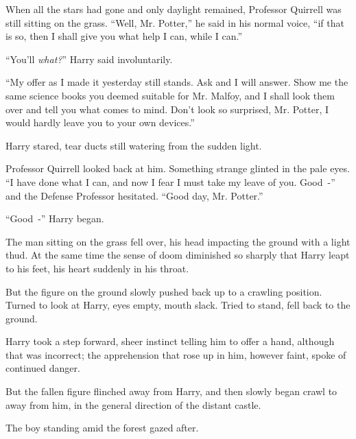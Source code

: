 When all the stars had gone and only daylight remained, Professor Quirrell was still sitting on the grass. ``Well, Mr. Potter,'' he said in his normal voice, ``if that is so, then I shall give you what help I can, while I can.''

``You'll \emph{what?}'' Harry said involuntarily.

``My offer as I made it yesterday still stands. Ask and I will answer. Show me the same science books you deemed suitable for Mr. Malfoy, and I shall look them over and tell you what comes to mind. Don't look so surprised, Mr. Potter, I would hardly leave you to your own devices.''

Harry stared, tear ducts still watering from the sudden light.

Professor Quirrell looked back at him. Something strange glinted in the pale eyes. ``I have done what I can, and now I fear I must take my leave of you. Good~-'' and the Defense Professor hesitated. ``Good day, Mr. Potter.''

``Good~-'' Harry began.

The man sitting on the grass fell over, his head impacting the ground with a light thud. At the same time the sense of doom diminished so sharply that Harry leapt to his feet, his heart suddenly in his throat.

But the figure on the ground slowly pushed back up to a crawling position. Turned to look at Harry, eyes empty, mouth slack. Tried to stand, fell back to the ground.

Harry took a step forward, sheer instinct telling him to offer a hand, although that was incorrect; the apprehension that rose up in him, however faint, spoke of continued danger.

But the fallen figure flinched away from Harry, and then slowly began crawl to away from him, in the general direction of the distant castle.

The boy standing amid the forest gazed after.
